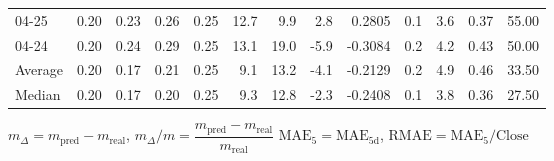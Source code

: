\begin{threeparttable}
{\begin{tabular}{lrrrrrrrrrrrr}
  04-25 &          0.20 &          0.23 &          0.26 &        0.25 &                12.7 &                 9.9 &        2.8 &       0.2805 &                 0.1 &              3.6 &            0.37 &                  55.00 \\
  04-24 &          0.20 &          0.24 &          0.29 &        0.25 &                13.1 &                19.0 &       -5.9 &      -0.3084 &                 0.2 &              4.2 &            0.43 &                  50.00 \\
Average &          0.20 &          0.17 &          0.21 &        0.25 &                 9.1 &                13.2 &       -4.1 &      -0.2129 &                 0.2 &              4.9 &            0.46 &                  33.50 \\
 Median &          0.20 &          0.17 &          0.20 &        0.25 &                 9.3 &                12.8 &       -2.3 &      -0.2408 &                 0.1 &              3.8 &            0.36 &                  27.50 \\
\bottomrule
\end{tabular}
}
\begin{tablenotes}\footnotesize
\item $m_\Delta=m_{\text{pred}}-m_{\text{real}}$,
$m_\Delta/m=\dfrac{m_{\text{pred}}-m_{\text{real}}}{m_{\text{real}}}$
$\mathrm{MAE}_5=\mathrm{MAE}_{5\text{d}}$,
$\mathrm{RMAE}=\mathrm{MAE}_5/\text{Close}$
\end{tablenotes}
\end{threeparttable}
\endgroup

